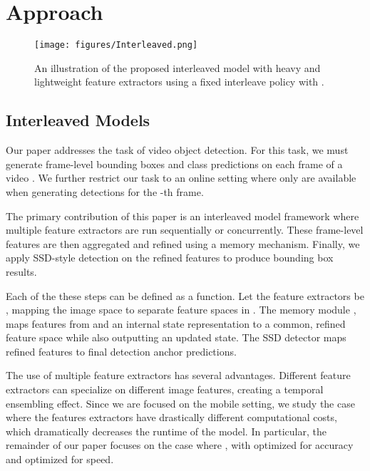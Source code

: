 \documentclass[10pt,twocolumn,letterpaper]{article}
\begin{document}
\section{Approach}

\begin{figure}[b]
\begin{center}
\texttt{[image: figures/Interleaved.png]}
\end{center}
\vspace{-2em}
  \caption{An illustration of the proposed interleaved model with heavy and lightweight feature extractors using a fixed interleave policy with .}
\label{fig:Interleaved}
\end{figure}


\subsection{Interleaved Models}
Our paper addresses the task of video object detection. For this task, we must generate frame-level bounding boxes and class predictions on each frame of a video . We further restrict our task to an online setting where only   are available when generating detections for the -th frame.

The primary contribution of this paper is an interleaved model framework where multiple feature extractors are run sequentially or concurrently. These frame-level features are then aggregated and refined using a memory mechanism. Finally, we apply SSD-style \cite{liu2016ssd} detection on the refined features to produce bounding box results.

Each of the these steps can be defined as a function. Let the  feature extractors be ,  mapping the image space to separate feature spaces in . The memory module , maps features from  and an internal state representation to a common, refined feature space while also outputting an updated state. The SSD detector  maps refined features to final detection anchor predictions.

The use of multiple feature extractors has several advantages. Different feature extractors can specialize on different image features, creating a temporal ensembling effect. Since we are focused on the mobile setting, we study the case where the features extractors have drastically different computational costs, which dramatically decreases the runtime of the model. In particular, the remainder of our paper focuses on the case where , with  optimized for accuracy and  optimized for speed.
\end{document}
